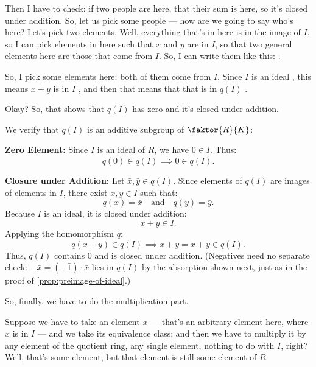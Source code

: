 \begin{proofWrapper}
\begin{speech}[00:25:06 - 00:26:54]
Then I have to check: if two people are here, that their sum is here, so it's closed under addition. So, let us pick some people --- how are we going to say who's here? Let's pick two elements. Well, everything that's in here is in the image of $I$, so I can pick elements in here such that $x$ and $y$ are in $I$, so that two general elements here are those that come from $I$. So, I can write them like this: .

So, I pick some elements here; both of them come from $I$. Since $I$ is an ideal , this means $x + y$ is in $I$ , and then that means that that is in $q(I)$ .

Okay? So, that shows that $q(I)$ has zero and it's closed under addition.
\end{speech}

\begin{content}
We verify that $q(I)$ is an additive subgroup of $\faktor{R}{K}$:

\textbf{Zero Element:}
Since $I$ is an ideal of $R$, we have $0 \in I$. Thus:
\[
q(0) \in q(I) \implies \bar{0} \in q(I).
\]

\textbf{Closure under Addition:}
Let $\bar{x}, \bar{y} \in q(I)$. Since elements of $q(I)$ are images of elements in $I$, there exist $x, y \in I$ such that:
\[
q(x) = \bar{x} \quad \text{and} \quad q(y) = \bar{y}.
\]
Because $I$ is an ideal, it is closed under addition:
\[
x + y \in I.
\]
Applying the homomorphism $q$:
\[
q(x + y) \in q(I) \implies \overline{x + y} = \bar{x} + \bar{y} \in q(I).
\]
Thus, $q(I)$ contains $\bar{0}$ and is closed under addition. (Negatives need no separate check: $-\bar{x} = (-\bar{1}) \cdot \bar{x}$ lies in $q(I)$ by the absorption shown next, just as in the proof of \cref{prop:preimage-of-ideal}.)
\end{content}

\begin{speech}[00:26:54 - 00:28:26]
So, finally, we have to do the multiplication part.

Suppose we have to take an element $x$ --- that's an arbitrary element here, where $x$ is in $I$ --- and we take its equivalence class; and then we have to multiply it by any element of the quotient ring, any single element, nothing to do with $I$, right? Well, that's some element, but that element is still some element of $R$.


\end{speech}
\end{proofWrapper}

